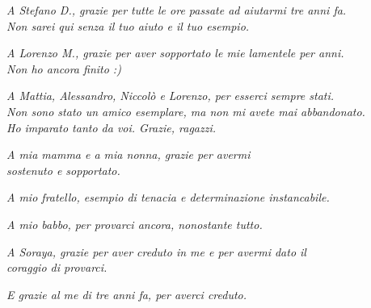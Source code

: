 \documentclass[twoside,openright,titlepage,fleqn,
	headinclude,12pt,a4paper,BCOR=5mm,footinclude]{scrbook}
\begin{document}
\frenchspacing
\raggedbottom
{}
\pagestyle{plain}

\pagestyle{scrheadings}
\tableofcontents
\listoffigures
\cleardoublepage
\thispagestyle{empty}
\begin{flushright}
\null{}
\begin{center}

\emph{
A Stefano D., grazie per tutte le ore passate ad aiutarmi tre anni fa.\\
Non sarei qui senza il tuo aiuto e il tuo esempio.
} \vspace{1cm}

\emph{
A Lorenzo M., grazie per aver sopportato le mie lamentele per anni.\\
Non ho ancora finito :)
} \vspace{1cm}

\emph{
A Mattia, Alessandro, Niccolò e Lorenzo, per esserci sempre stati.\\
Non sono stato un amico esemplare, ma non mi avete mai abbandonato.\\
Ho imparato tanto da voi. Grazie, ragazzi.
} \vspace{1cm}

\emph{
A mia mamma e a mia nonna, grazie per avermi\\
sostenuto e sopportato.
} \vspace{1cm}

\emph{
A mio fratello, esempio di tenacia e determinazione instancabile.
} \vspace{1cm}

\emph{
A mio babbo, per provarci ancora, nonostante tutto.
} \vspace{1cm}

\emph{
A Soraya, grazie per aver creduto in me e per avermi dato il\\
coraggio di provarci.
} \vspace{1cm}

\emph{
E grazie al me di tre anni fa, per averci creduto.
}

\end{center}


\begin{comment}
	\emph{"Se avessi avuto più tempo, avrei scritto una lettera più breve." \break --- Blaise Pascal} \vspace{\stretch{2}}\null
\end{comment}
\end{flushright}
\cleardoublepage
\end{document}
